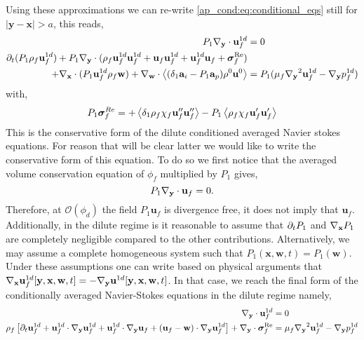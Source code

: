 Using these approximations we can re-write \ref{ap_cond:eq:conditional_eqs} still for $|\textbf{y}-\textbf{x}| > a$, this reads,  
\begin{align}
    P_1 {\mathbf{\nabla}_\textbf{y}} \cdot \textbf{u}^{1d}_f &= 0 \\
    \partial_t (P_1 \rho_f \textbf{u}_f^{1d})
    + P_1 {\mathbf{\nabla}_\textbf{y}}\cdot (
    \rho_f \textbf{u}^{1d}_f\textbf{u}_f^{1d} 
    + \textbf{u}_f\textbf{u}_f^{1d}
    + \textbf{u}^{1d}_f\textbf{u}_f
    + \bm\sigma^\text{Re}_f)\nonumber\\
    + {\mathbf{\nabla}_\textbf{x}}\cdot (P_1 \textbf{u}_f^{1d}\rho_f\textbf{w}) 
    + {\mathbf{\nabla}_\textbf{w}}\cdot \left<(\delta_1 \textbf{a}_i- P_1 \textbf{a}_p)\rho^0\textbf{u}^0 \right>
    &= P_1 (
        \mu_f {\mathbf{\nabla}_\textbf{y}}^2 \textbf{u}^{1d}_f  
        - {\mathbf{\nabla}_\textbf{y}} p_f^{1d} 
    )
\end{align}
with, 
\begin{equation*}
    P_1\bm\sigma^{Re}_f
    = 
    + \left<\delta_1\rho_f\chi_f\textbf{u}_f''\textbf{u}_f''\right>
    - P_1 \left<\rho_f\chi_f\textbf{u}_f'\textbf{u}_f'\right>
\end{equation*}
This is the conservative form of the dilute conditioned averaged Navier stokes equations. 
For reason that will be clear latter we would like to write the conservative form of this equation.
To do so we first notice that the averaged volume conservation equation of $\phi_f$ multiplied by $P_1$ gives, 
\begin{equation*}
    P_1{\mathbf{\nabla}_\textbf{y}} \cdot \textbf{u}_f = 0.
\end{equation*}
Therefore, at $\mathcal{O}(\phi_d)$ the field $P_1\textbf{u}_f$ is divergence free, it does not imply that $\textbf{u}_f$. 
Additionally, in the dilute regime is it reasonable to assume that $\partial_t P_1$ and ${\mathbf{\nabla}_\textbf{x}} P_1$ are completely negligible compared to the other contributions. 
Alternatively, we may assume a complete homogeneous system such that $P_1(\textbf{x},\textbf{w},t) = P_1(\textbf{w})$. 
Under these assumptions one can write based on physical arguments that ${\mathbf{\nabla}_\textbf{x}} \textbf{u}_f^{1d}[\textbf{y},\textbf{x},\textbf{w},t] = - {\mathbf{\nabla}_\textbf{y}} \textbf{u}^{1d}[\textbf{y},\textbf{x},\textbf{w},t]$.
In that case, we reach the final form of the conditionally averaged Navier-Stokes equations in the dilute regime  namely, 
\begin{align}
    {\mathbf{\nabla}_\textbf{y}} \cdot \textbf{u}^{1d}_f &= 0 \\
    \rho_f \left[
        \partial_t \textbf{u}_f^{1d}
        +  \textbf{u}^{1d}_f\cdot {\mathbf{\nabla}_\textbf{y}}\textbf{u}_f^{1d} 
        +  \textbf{u}^{1d}_f\cdot {\mathbf{\nabla}_\textbf{y}}\textbf{u}_f 
        +  (\textbf{u}_f - \textbf{w})\cdot {\mathbf{\nabla}_\textbf{y}}\textbf{u}_f^{1d}
    \right]
    + {\mathbf{\nabla}_\textbf{y}} \cdot \bm\sigma^\text{Re}_f
    &=
        \mu_f {\mathbf{\nabla}_\textbf{y}}^2 \textbf{u}^{1d}_f  
        - {\mathbf{\nabla}_\textbf{y}} p_f^{1d} 
    \label{eq:conditional_avg_eq_final}
\end{align}
